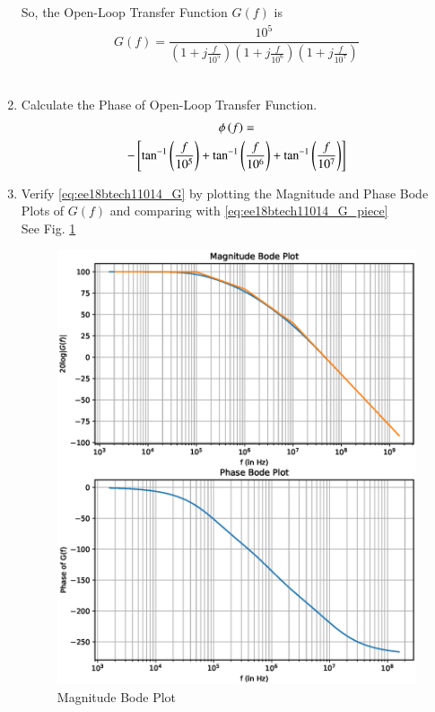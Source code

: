 \begin{enumerate}[label=\thesection.\arabic*.,ref=\thesection.\theenumi]
So, the Open-Loop Transfer Function $G(f)$ is
\begin{align}
\label{eq:ee18btech11014_G}
	G(f) = \dfrac{10^{5}}{\left(1+j\frac{f}{10^{5}}\right)\left(1+j\frac{f}{10^{6}}\right)\left(1+j\frac{f}{10^{7}}\right)}
\end{align}\\
\item Calculate the Phase of Open-Loop Transfer Function.\\
\solution
%
\begin{multline}
\label{eq:ee18btech11014_G_ang}
\phi\left(f\right) =
\\
-{}\left[\tan ^{-1}\left(\frac{f}{10^{5}}\right)+\tan ^{-1}\left(\frac{f}{10^{6}}\right)+\tan ^{-1}\left(\frac{f}{10^{7}}\right)\right]
\end{multline}

\item Verify  \eqref{eq:ee18btech11014_G} by plotting the 
Magnitude and Phase Bode Plots of $G(f)$ and comparing with \eqref{eq:ee18btech11014_G_piece}
\\
\solution
See Fig.   \ref{fig:ee18btech11014_Bode Plot}
\begin{figure}[ht!]
	\begin{center}
		\includegraphics[width=\columnwidth]{./figs/ee18btech11014/Bode_Plot.eps}
	\end{center}
	\caption{Magnitude Bode Plot}
	\label{fig:ee18btech11014_Bode Plot}
\end{figure}


\end{enumerate}
